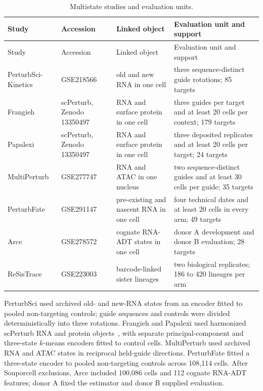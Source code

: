 \documentclass[10pt,a4paper]{article}
\begin{document}
\begin{longtable}{@{}P{2.5cm}P{2.6cm}P{4.2cm}P{6.2cm}@{}}
\caption{Multistate studies and evaluation units.}\label{tab:s-multistate-data}\\
\toprule
Study & Accession & Linked object & Evaluation unit and support \\
\midrule
\endfirsthead
\toprule
Study & Accession & Linked object & Evaluation unit and support \\
\midrule
\endhead
PerturbSci-Kinetics~\cite{perturbsci2023} & GSE218566 & old and new RNA in one cell & three sequence-distinct guide rotations; 85 targets \\
Frangieh~\cite{frangieh2021} & scPerturb, Zenodo 13350497 & RNA and surface protein in one cell & three guides per target and at least 20 cells per context; 179 targets \\
Papalexi~\cite{papalexi2021} & scPerturb, Zenodo 13350497 & RNA and surface protein in one cell & three deposited replicates and at least 20 cells per target; 24 targets \\
MultiPerturb\linebreak\cite{multiperturb2024} & GSE277747 & RNA and ATAC in one nucleus & two sequence-distinct guides and at least 30 cells per guide; 35 targets \\
PerturbFate~\cite{perturbfate2026} & GSE291147 & pre-existing and nascent RNA in one cell & four technical dates and at least 20 cells in every arm; 49 targets \\
Arce~\cite{arce2024} & GSE278572 & cognate RNA-ADT states in one cell & donor A development and donor B evaluation; 28 targets \\
ReSisTrace~\cite{resistrace2024} & GSE223003 & barcode-linked sister lineages & two biological replicates; 186 to 420 lineages per arm \\
\bottomrule
\end{longtable}

PerturbSci used archived old- and new-RNA states from an encoder fitted to pooled non-targeting controls; guide sequences and controls were divided deterministically into three rotations. Frangieh and Papalexi used harmonized scPerturb RNA and protein objects~\cite{scperturb2024}, with separate principal-component and three-state $k$-means encoders fitted to control cells. MultiPerturb used archived RNA and ATAC states in reciprocal held-guide directions. PerturbFate fitted a three-state encoder to pooled non-targeting controls across 108,114 cells. After Souporcell exclusions, Arce included 100,086 cells and 112 cognate RNA-ADT features; donor A fixed the estimator and donor B supplied evaluation.
\end{document}

